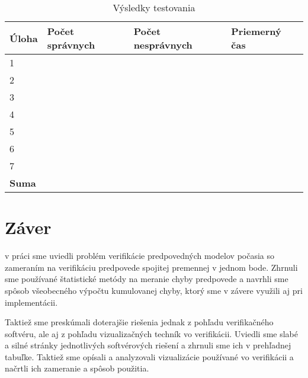 \begin{table}[h]
\centering
\caption{Výsledky testovania}
\label{table:results}
\begin{tabular}{|l|l|l|l|}
\hline
\textbf{Úloha} & \textbf{Počet správnych} & \textbf{Počet nesprávnych} & \textbf{Priemerný čas} \\ \hline
1              &                          &                            &                                    \\ \hline
2              &                          &                            &                                    \\ \hline
3              &                          &                            &                                    \\ \hline
4              &                          &                            &                                    \\ \hline
5              &                          &                            &                                    \\ \hline
6              &                          &                            &                                    \\ \hline
7              &                          &                            &                                    \\ \hline
\textbf{Suma}  &                          &                            &                                    \\ \hline
\end{tabular}
\end{table}


\section{Záver}
v práci sme uviedli problém verifikácie predpovedných modelov počasia so zameraním na verifikáciu predpovede spojitej premennej v jednom bode. Zhrnuli sme používané štatistické metódy na meranie chyby predpovede a navrhli sme spôsob všeobecného výpočtu kumulovanej chyby, ktorý sme v závere využili aj pri implementácii.

Taktiež sme preskúmali doterajšie riešenia jednak z pohľadu verifikačného softvéru, ale aj z pohľadu vizualizačných techník vo verifikácii. Uviedli sme slabé a silné stránky jednotlivých softvérových riešení a zhrnuli sme ich v prehľadnej tabuľke. Taktiež sme opísali a analyzovali vizualizácie používané vo verifikácii a načrtli ich zameranie a spôsob použitia.

